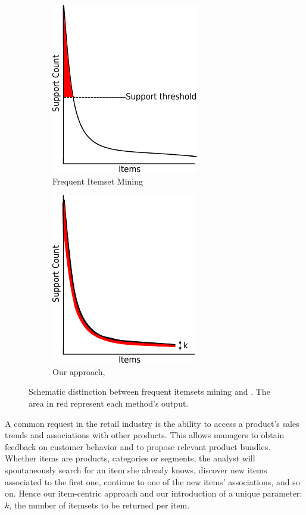 \begin{figure}
	\centering
	\begin{subfigure}[b]{0.48\textwidth}
		\centering
		\includegraphics{fig/topPI-vs-classic/freq_distrib_standard.pdf}
		\caption{Frequent Itemset Mining}
	\end{subfigure}
	\hfill
	\begin{subfigure}[b]{0.48\textwidth}
		\centering
		\includegraphics{fig/topPI-vs-classic/freq_distrib_topk.pdf}
		\caption{Our approach, \toppi}
	\end{subfigure}
	\caption{\label{fig:toppiVSclassic}
		Schematic distinction between frequent itemsets mining and \toppi.
		The area in red represent each method's output.
	}
\end{figure}

A common request in the retail industry is
the ability to access a product's sales trends and associations with other products.
This allows managers to obtain feedback on customer behavior
and to propose relevant product bundles.
Whether items are products, categories or segments,
the analyst will spontaneously search for an item she already knows,
discover new items associated to the first one,
continue to one of the new items' associations, and so on.
Hence our item-centric approach and our introduction of a unique parameter:
$k$, the number of itemsets to be returned per item.


